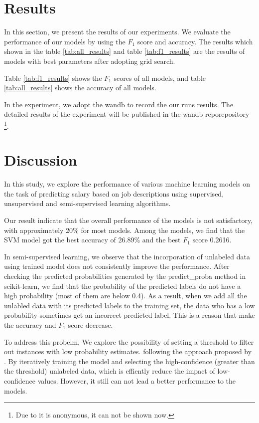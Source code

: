 \documentclass[11pt]{article}
\begin{document}
\section{Results}

In this section, we present the results of our experiments.
We evaluate the performance of our models by using the $F_1$ score and accuracy.
The results which shown in the table \ref{tab:all_results} and table \ref{tab:f1_results} are the results of models with best parameters after adopting grid search.

Table \ref{tab:f1_results} shows the $F_1$ scores of all models,
and table \ref{tab:all_results} shows the accuracy of all models.



In the experiment, we adopt the wandb to record the our runs results.
The detailed results of the experiment will be published in the wandb reporepository \footnote{Due to it is anonymous, it can not be shown now.}.




\section{Discussion}

In this study, we explore the performance of various machine learning models on the task of predicting salary based on job descriptions using
supervised, unsupervised and semi-supervised learning algorithms.

Our result indicate that the overall performance of the models is not satisfactory,
with approximately 20\% for most models.
Among the models, we find that the SVM model got the best accuracy of 26.89\% and the best $F_1$ score 0.2616.

In semi-supervised learning, we observe that the incorporation of unlabeled data using trained model does not consistently improve the performance.
After checking the predicted probabilities generated by the predict\_proba method in scikit-learn,
we find that the probability of the predicted labels do not have a high probability (most of them are below 0.4).
As a result, when we add all the unlabled data with its predicted labels to the training set,
the data who has a low probability sometimes get an incorrect predicted label.
This is a reason that make the accuracy and $F_1$ score decrease.


To address this probelm, We explore the possibility of setting a threshold to filter out instances with low probability estimates.
following the approach proposed by \cite{Self-trained-semi-supervised-learning}.
By iteratively training the model and selecting the high-confidence (greater than the threshold) unlabeled data,
which is effiently reduce the impact of low-confidence values.
However, it still can not lead a better performance to the models.
\end{document}
